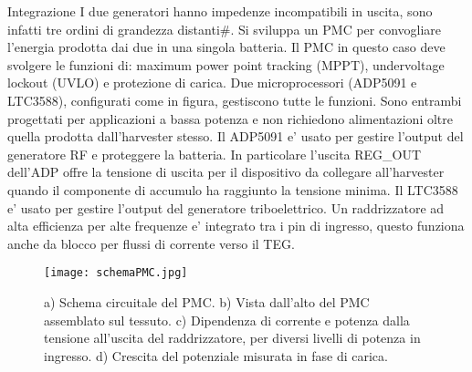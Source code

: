 \begin{section}{Integrazione}
    I due generatori hanno impedenze incompatibili in uscita, sono infatti tre ordini di grandezza distanti\#. Si sviluppa un PMC per convogliare l'energia prodotta dai due in una singola batteria. Il PMC in questo caso deve svolgere le funzioni di: maximum power point tracking (MPPT), undervoltage lockout (UVLO) e protezione di carica. Due microprocessori (ADP5091 e LTC3588), configurati come in figura, gestiscono tutte le funzioni. Sono entrambi progettati per applicazioni a bassa potenza e non richiedono alimentazioni oltre quella prodotta dall'harvester stesso. Il ADP5091 e' usato per gestire l'output del generatore RF e proteggere la batteria. In particolare l'uscita REG\_OUT dell'ADP offre la tensione di uscita per il dispositivo da collegare all'harvester quando il componente di accumulo ha raggiunto la tensione minima. Il LTC3588 e' usato per gestire l'output del generatore triboelettrico. Un raddrizzatore ad alta efficienza per alte frequenze e' integrato  tra i pin di ingresso, questo funziona anche da blocco per flussi di corrente verso il TEG.

    \begin{figure}[hbt!]
        \texttt{[image: schemaPMC.jpg]}
        \centering
        \caption{a) Schema circuitale del PMC. b) Vista dall'alto del PMC assemblato sul tessuto. c) Dipendenza di corrente e potenza dalla tensione all'uscita del raddrizzatore, per diversi livelli di potenza in ingresso. d) Crescita del potenziale misurata in fase di carica.}
    \end{figure}


\end{section}
